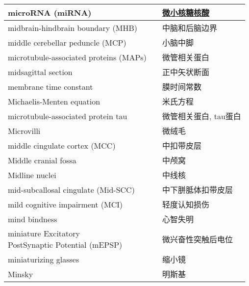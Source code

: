 \begin{longtable}{lll}
	\midrule
	microRNA (miRNA)   && \href{https://baike.baidu.com/item/micro\%20RNA/3683223}{微小核糖核酸}  \\
	
	\midrule
	midbrain-hindbrain boundary (MHB) && 中脑和后脑边界  \\
	
	\midrule
	middle cerebellar peduncle (MCP)  && 小脑中脚  \\
	
	\midrule
	microtubule-associated proteins (MAPs)  && 微管相关蛋白  \\
	
	\midrule
	midsagittal section  && 正中矢状断面  \\
	
	\midrule
	membrane time constant   && 膜时间常数  \\
	
	\midrule
	Michaelis-Menten equation   && 米氏方程  \\
	
	\midrule
	microtubule-associated protein tau    && 微管相关蛋白, tau蛋白  \\
	
	\midrule
	Microvilli    && 微绒毛  \\
	
	\midrule
	middle cingulate cortex (MCC)   && 中扣带皮层  \\
	
	\midrule
	Middle cranial fossa   && 中颅窝  \\
	
	\midrule
	Midline nuclei   && 中线核  \\
	
	\midrule
	mid-subcallosal cingulate (Mid-SCC)  && 中下胼胝体扣带皮层  \\
	
	\midrule
	mild cognitive impairment (MCI)  && 轻度认知损伤  \\
	
	\midrule
	mind bindness  && 心智失明  \\
	
	\midrule
	\makecell[l]{miniature Excitatory \\PostSynaptic Potential (mEPSP) } && 微兴奋性突触后电位  \\
	
	\midrule
	miniaturizing 	glasses  && 缩小镜  \\
	
	\midrule
	Minsky  && 明斯基  \\
	

\end{longtable}
